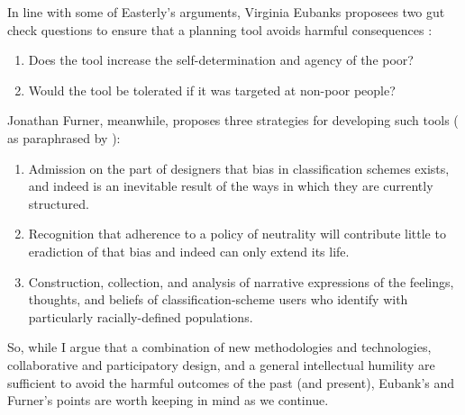 In line with some of Easterly's arguments, Virginia Eubanks proposees two gut check questions to ensure that a planning tool avoids harmful consequences \cite{eubanksAutomatingInequalityHow2018}:

\begin{enumerate} \setlength{\itemsep}{0pt} \setlength{\parskip}{0pt} 
	\item{Does the tool increase the self-determination and agency of the poor?}
	\item{Would the tool be tolerated if it was targeted at non-poor people?}
\end{enumerate}

Jonathan Furner, meanwhile, proposes three strategies for developing such tools (\cite{furner2007dewey} as paraphrased by \cite{nobleAlgorithmsOppressionHow2018}):

\begin{enumerate} \setlength{\itemsep}{0pt} \setlength{\parskip}{0pt} 
	\item{Admission on the part of designers that bias in classification schemes exists, and indeed is an inevitable result of the ways in which they are currently structured.}
	\item{Recognition that adherence to a policy of neutrality will contribute little to eradiction of that bias and indeed can only extend its life.}
	\item{Construction, collection, and analysis of narrative expressions of the feelings, thoughts, and beliefs of classification-scheme users who identify with particularly racially-defined populations.}
\end{enumerate}

So, while I argue that a combination of new methodologies and technologies, collaborative and participatory design, and a general intellectual humility are sufficient to avoid the harmful outcomes of the past (and present), Eubank's and Furner's points are worth keeping in mind as we continue.




%

